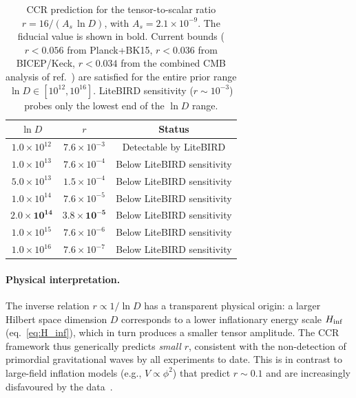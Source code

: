 \begin{table}[t]
  \centering
  \begin{tabular}{ccc}
    \hline\hline
    $\ln D$ & $r$ & Status \\
    \hline
    $1.0\times 10^{12}$ & $7.6\times 10^{-3}$ & Detectable by LiteBIRD \\
    $1.0\times 10^{13}$ & $7.6\times 10^{-4}$ & Below LiteBIRD sensitivity \\
    $5.0\times 10^{13}$ & $1.5\times 10^{-4}$ & Below LiteBIRD sensitivity \\
    $1.0\times 10^{14}$ & $7.6\times 10^{-5}$ & Below LiteBIRD sensitivity \\
    $\mathbf{2.0\times 10^{14}}$ & $\mathbf{3.8\times 10^{-5}}$ & Below LiteBIRD sensitivity \\
    $1.0\times 10^{15}$ & $7.6\times 10^{-6}$ & Below LiteBIRD sensitivity \\
    $1.0\times 10^{16}$ & $7.6\times 10^{-7}$ & Below LiteBIRD sensitivity \\
    \hline\hline
  \end{tabular}
  \caption{CCR prediction for the tensor-to-scalar ratio $r = 16/(A_s\,\ln D)$,
    with $A_s = 2.1\times 10^{-9}$. The fiducial value is shown in bold.
    Current bounds ($r < 0.056$ from Planck+BK15, $r < 0.036$ from BICEP/Keck,
    $r < 0.034$ from the combined CMB analysis of ref.~\cite{Campeti:2025})
    are satisfied for the entire prior range $\ln D \in [10^{12}, 10^{16}]$.
    LiteBIRD sensitivity ($r \sim 10^{-3}$) probes only the lowest end of
    the $\ln D$ range.}
  \label{tab:tensor_ratio}
\end{table}

\paragraph{Physical interpretation.}
The inverse relation $r \propto 1/\ln D$ has a transparent physical origin:
a larger Hilbert space dimension $D$ corresponds to a lower inflationary
energy scale $H_{\rm inf}$ (eq.~\eqref{eq:H_inf}), which in turn produces
a smaller tensor amplitude. The CCR framework thus generically predicts
\emph{small} $r$, consistent with the non-detection of primordial
gravitational waves by all experiments to date. This is in contrast to
large-field inflation models (e.g., $V \propto \phi^2$) that predict $r \sim 0.1$
and are increasingly disfavoured by the data~\cite{Planck:2018inflation}.

